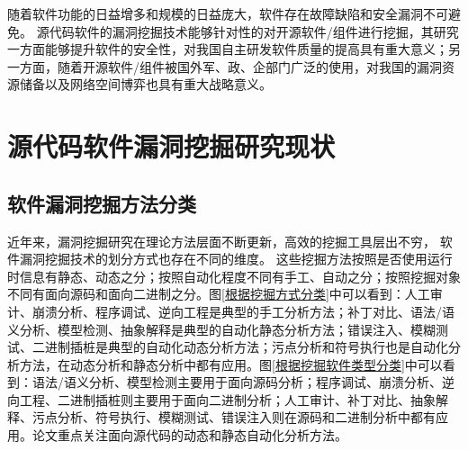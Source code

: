 随着软件功能的日益增多和规模的日益庞大，软件存在故障缺陷和安全漏洞不可避免。
源代码软件的漏洞挖掘技术能够针对性的对开源软件/组件进行挖掘，其研究一方面能够提升软件的安全性，对我国自主研发软件质量的提高具有重大意义；另一方面，随着开源软件/组件被国外军、政、企部门广泛的使用，对我国的漏洞资源储备以及网络空间博弈也具有重大战略意义。




\section{源代码软件漏洞挖掘研究现状}

\subsection{软件漏洞挖掘方法分类}
近年来，漏洞挖掘研究在理论方法层面不断更新，高效的挖掘工具层出不穷，
软件漏洞挖掘技术的划分方式也存在不同的维度。 %
这些挖掘方法按照是否使用运行时信息有静态、动态之分；按照自动化程度不同有手工、自动之分；按照挖掘对象不同有面向源码和面向二进制之分。图\ref{根据挖掘方式分类}中可以看到：人工审计、崩溃分析、程序调试、逆向工程是典型的手工分析方法；补丁对比、语法/语义分析、模型检测、抽象解释是典型的自动化静态分析方法；错误注入、模糊测试、二进制插桩是典型的自动化动态分析方法；污点分析和符号执行也是自动化分析方法，在动态分析和静态分析中都有应用。图\ref{根据挖掘软件类型分类}中可以看到：语法/语义分析、模型检测主要用于面向源码分析；程序调试、崩溃分析、逆向工程、二进制插桩则主要用于面向二进制分析；人工审计、补丁对比、抽象解释、污点分析、符号执行、模糊测试、错误注入则在源码和二进制分析中都有应用。论文重点关注面向源代码的动态和静态自动化分析方法。

